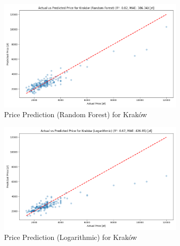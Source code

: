 \begin{figure}[H]
    \centering
    \includegraphics[width=0.8\textwidth]{figures/krakow_price_prediction_rf.png}
    \caption{Price Prediction (Random Forest) for Kraków}
\end{figure}
\begin{figure}[H]
    \centering
    \includegraphics[width=0.8\textwidth]{figures/krakow_price_prediction_logarithmic.png}
    \caption{Price Prediction (Logarithmic) for Kraków}
\end{figure}

